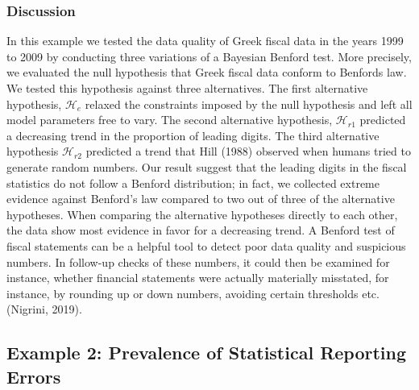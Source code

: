 \documentclass[
  english,
  man,floatsintext]{apa6}
\begin{document}
\hypertarget{discussion}{%
\subsubsection{Discussion}\label{discussion}}

In this example we tested the data quality of Greek fiscal data in the years 1999 to 2009 by conducting three variations of a Bayesian Benford test. More precisely, we evaluated the null hypothesis that Greek fiscal data conform to Benfords law. We tested this hypothesis against three alternatives. The first alternative hypothesis, \(\mathcal{H}_e\) relaxed the constraints imposed by the null hypothesis and left all model parameters free to vary. The second alternative hypothesis, \(\mathcal{H}_{r1}\) predicted a decreasing trend in the proportion of leading digits. The third alternative hypothesis \(\mathcal{H}_{r2}\) predicted a trend that Hill (1988) observed when humans tried to generate random numbers. Our result suggest that the leading digits in the fiscal statistics do not follow a Benford distribution; in fact, we collected extreme evidence against Benford's law compared to two out of three of the alternative hypotheses. When comparing the alternative hypotheses directly to each other, the data show most evidence in favor for a decreasing trend. A Benford test of fiscal statements can be a helpful tool to detect poor data quality and suspicious numbers. In follow-up checks of these numbers, it could then be examined for instance, whether financial statements were actually materially misstated, for instance, by rounding up or down numbers, avoiding certain thresholds etc. (Nigrini, 2019).

\hypertarget{example-2-prevalence-of-statistical-reporting-errors}{%
\subsection{Example 2: Prevalence of Statistical Reporting Errors}\label{example-2-prevalence-of-statistical-reporting-errors}}
\end{document}
